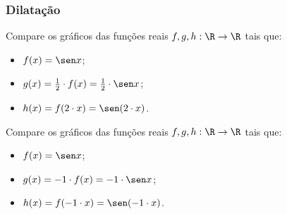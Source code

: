 \subsubsection{Dilatação}

\begin{example}
  Compare os gráficos das funções reais $f, g , h: \R \to \R$ tais que:
  \begin{itemize}
    \item $f(x) = \sen x$;
    \item $g(x) = \frac 1 2 \cdot f(x)  = \frac 1 2 \cdot \sen x $;
    \item $h(x)= f(2 \cdot x)= \sen (2 \cdot x)$.
  \end{itemize}
  \begin{center}
    
  \end{center}
  \begin{center}
    
  \end{center}
\end{example}

\begin{example}
Compare os gráficos das funções reais $f, g , h: \R \to \R$ tais que:
  \begin{itemize}
    \item $f(x) = \sen x$;
    \item $g(x) = -1 \cdot f(x)  = -1 \cdot \sen x $;
    \item $h(x)= f(-1 \cdot x)= \sen (-1 \cdot x)$.
  \end{itemize}
  \begin{center}
    
  \end{center}
  \begin{center}
    
  \end{center}
\end{example}

